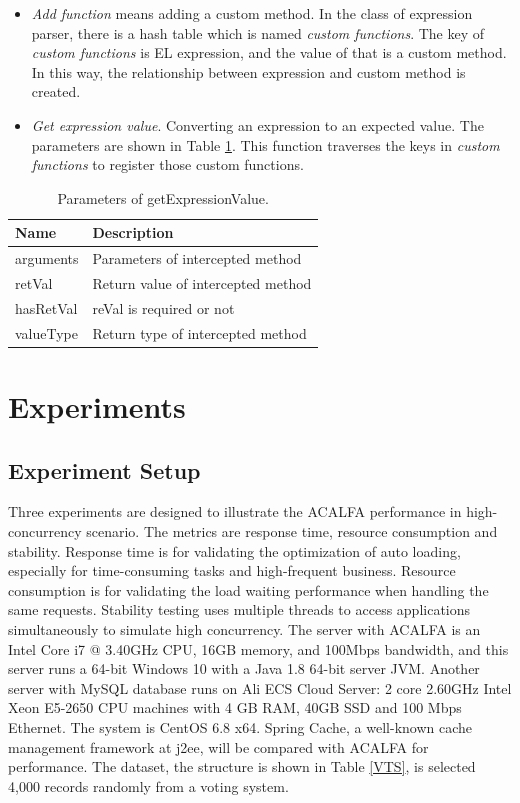 \documentclass{singlecol-new}
\theoremstyle{TH}{
\newtheorem{lemma}{Lemma}
\newtheorem{theorem}[lemma]{Theorem}
\newtheorem{corrolary}[lemma]{Corrolary}
\newtheorem{conjecture}[lemma]{Conjecture}
\newtheorem{proposition}[lemma]{Proposition}
\newtheorem{claim}[lemma]{Claim}
\newtheorem{stheorem}[lemma]{Wrong Theorem}
}
\theoremstyle{THrm}{
\newtheorem{definition}{Definition}[section]
\newtheorem{question}{Question}[section]
\newtheorem{remark}{Remark}
\newtheorem{scheme}{Scheme}
}
\theoremstyle{THhit}{
\newtheorem{case}{Case}[section]
}
\begin{document}
\begin{itemize}
  \item \textit{Add function} means adding a custom method. In the class of expression parser, there is a hash table which is named \textit{custom functions}. The key of \textit{custom functions} is EL expression, and the value of that is a custom method. In this way, the relationship between expression and custom method is created.
  \item \textit{Get expression value}. Converting an expression to an expected value. The parameters are shown in Table \ref{getExpressionValue}. This function traverses the keys in \textit{custom functions} to register those custom functions.
\end{itemize}

\begin{table}[htb]
\begin{center}
 \caption{\label{getExpressionValue}Parameters of getExpressionValue.}
 \begin{tabular}{ll}
 \toprule
Name & Description\\
 \midrule
arguments & Parameters of intercepted method\\
retVal & Return value of intercepted method\\
hasRetVal & reVal is required or not\\
valueType & Return type of intercepted method\\
\bottomrule
 \end{tabular}
\end{center}
\end{table}

\section{Experiments}
\label{Experiments}

\subsection{Experiment Setup}
Three experiments are designed to illustrate the ACALFA performance in high-concurrency scenario. The metrics are response time, resource consumption and stability. Response time is for validating the optimization of auto loading, especially for time-consuming tasks and high-frequent business. Resource consumption is for validating the load waiting performance when handling the same requests. Stability testing uses multiple threads to access applications simultaneously to simulate high concurrency. The server with ACALFA is an Intel Core i7 @ 3.40GHz CPU, 16GB memory, and 100Mbps bandwidth, and this server runs a 64-bit Windows 10 with a Java 1.8 64-bit server JVM. Another server with MySQL database runs on Ali ECS Cloud Server: 2 core 2.60GHz Intel Xeon E5-2650 CPU machines with 4 GB RAM, 40GB SSD and 100 Mbps Ethernet. The system is CentOS 6.8 x64. Spring Cache, a well-known cache management framework at j2ee, will be compared with ACALFA for performance. The dataset, the structure is shown in Table \ref{VTS}, is selected 4,000 records randomly from a voting system.
\end{document}
